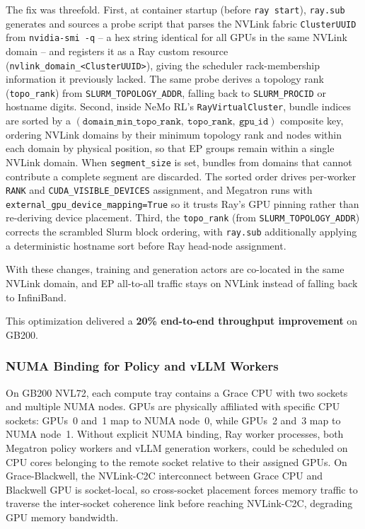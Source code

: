 The fix was threefold. First, at container startup (before \texttt{ray start}),
\texttt{ray.sub} generates and sources a probe script that parses the NVLink fabric
\texttt{ClusterUUID} from \texttt{nvidia-smi -q} -- a hex string identical for all
GPUs in the same NVLink domain -- and registers it as a Ray custom resource
(\texttt{nvlink\_domain\_<ClusterUUID>}), giving the scheduler rack-membership
information it previously lacked. The same probe derives a topology rank
(\texttt{topo\_rank}) from \texttt{SLURM\_TOPOLOGY\_ADDR}, falling back to
\texttt{SLURM\_PROCID} or hostname digits. Second, inside NeMo RL's
\texttt{RayVirtualCluster}, bundle indices are sorted by a
$(\texttt{domain\_min\_topo\_rank},\ \texttt{topo\_rank},\ \texttt{gpu\_id})$
composite key, ordering NVLink domains by their minimum topology rank and nodes
within each domain by physical position, so that EP groups remain within a single
NVLink domain. When \texttt{segment\_size} is set, bundles from domains that cannot
contribute a complete segment are discarded. The sorted order drives per-worker
\texttt{RANK} and \texttt{CUDA\_VISIBLE\_DEVICES} assignment, and Megatron runs with
\texttt{external\_gpu\_device\_mapping=True} so it trusts Ray's GPU pinning rather
than re-deriving device placement. Third, the \texttt{topo\_rank} (from
\texttt{SLURM\_TOPOLOGY\_ADDR}) corrects the scrambled Slurm block ordering, with
\texttt{ray.sub} additionally applying a deterministic hostname sort before
Ray head-node assignment.

With these changes, training and generation actors are co-located in the same
NVLink domain, and EP all-to-all traffic stays on NVLink instead of falling back to InfiniBand.

This optimization delivered a \textbf{20\% end-to-end throughput improvement} on GB200.


\subsubsection*{NUMA Binding for Policy and vLLM Workers}

On GB200 NVL72, each compute tray contains a Grace CPU with two sockets and multiple NUMA 
nodes. GPUs are physically affiliated with specific CPU sockets: GPUs~0 and~1 map to NUMA 
node~0, while GPUs~2 and~3 map to NUMA node~1. Without explicit NUMA binding, Ray worker 
processes, both Megatron policy workers and vLLM generation workers, could be scheduled on 
CPU cores belonging to the remote socket relative to their assigned GPUs. On 
Grace-Blackwell, the NVLink-C2C interconnect between Grace CPU and Blackwell GPU is 
socket-local, so cross-socket placement forces memory traffic to traverse the inter-socket 
coherence link before reaching NVLink-C2C, degrading GPU memory bandwidth.

